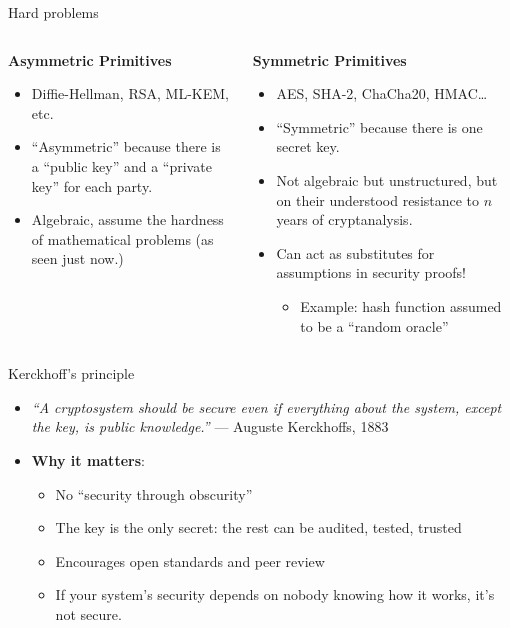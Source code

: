 \documentclass[aspectratio=169, lualatex, handout]{beamer}
\begin{document}
\begin{frame}{Hard problems}
	\begin{columns}[c]
		\begin{column}{0.5\textwidth}
			\textbf{Asymmetric Primitives}
			\begin{itemize}[<+->]
				\item Diffie-Hellman, RSA, ML-KEM, etc.
				\item ``Asymmetric'' because there is a ``public key'' and a ``private
				      key'' for each party.
				\item Algebraic, assume the hardness of mathematical problems (as seen
				      just now.)
			\end{itemize}
		\end{column}

		\begin{column}{0.5\textwidth}
			\textbf{Symmetric Primitives}
			\begin{itemize}[<+->]
				\item AES, SHA-2, ChaCha20, HMAC\ldots
				\item ``Symmetric'' because there is one secret key.
				\item Not algebraic but unstructured, but on their understood
				      resistance to $n$ years of cryptanalysis.
				\item Can act as substitutes for assumptions in security proofs!
				      \begin{itemize}
					      \item Example: hash function assumed to be a ``random oracle''
				      \end{itemize}
			\end{itemize}
		\end{column}
	\end{columns}
\end{frame}

\begin{frame}{Kerckhoff's principle}
	\begin{itemize}[<+->]
		\item \textit{``A cryptosystem should be secure even if everything about
			      the system, except the key, is public knowledge.''} — Auguste Kerckhoffs,
		      1883
		\item \textbf{Why it matters}:
		      \begin{itemize}[<+->]
			      \item No ``security through obscurity''
			      \item The key is the only secret: the rest can be audited, tested,
			            trusted
			      \item Encourages open standards and peer review
			      \item If your system's security depends on nobody knowing how it works,
			            it's not secure.
		      \end{itemize}
	\end{itemize}
\end{frame}
\end{document}
